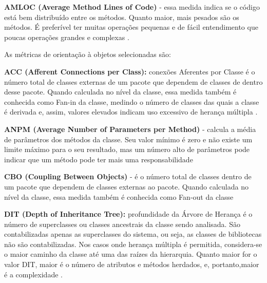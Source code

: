  \vspace{\onelineskip}

\textbf{AMLOC (Average Method Lines of Code)} - essa medida indica se o código está bem distribuído entre os métodos. Quanto maior, mais pesados são os métodos. É preferível ter muitas operações pequenas e de fácil entendimento que poucas operações grandes e complexas \cite{Meirelles2013}.



 \vspace{\onelineskip} 

As métricas de orientação à objetos selecionadas são:

\textbf{ACC (Afferent Connections per Class):} conexões Aferentes por Classe é o número
total de classes externas de um pacote que dependem de classes de dentro desse
pacote. Quando calculada no nível da classe, essa medida também é conhecida como
Fan-in da classe, medindo o número de classes das quais a classe é derivada e, assim,
valores elevados indicam uso excessivo de herança múltipla \cite{McCabe94} \cite{Chidamber94}.

 \vspace{\onelineskip} 

 \textbf{ANPM (Average Number of Parameters per Method)} - calcula a média de parâmetros dos métodos da classe. Seu valor mínimo é zero e não existe um limite máximo para o seu resultado, mas um número alto de parâmetros pode indicar que um método pode ter mais uma responsabilidade \cite{Basili1987}


 \vspace{\onelineskip} 

\textbf{CBO (Coupling Between Objects)} -  é o número total de classes dentro de um pacote que dependem de classes externas ao pacote. Quando calculada no nível da classe, essa medida também é conhecida como Fan-out da classe \cite{Chidamber94}

 \vspace{\onelineskip} 

\textbf{DIT (Depth of Inheritance Tree):} profundidade da Árvore de Herança é o número
de superclasses ou classes ancestrais da classe sendo analisada. São contabilizadas
apenas as superclasses do sistema, ou seja, as classes de bibliotecas não são
contabilizadas. Nos casos onde herança múltipla é permitida, considera-se o maior
caminho da classe até uma das raízes da hierarquia. Quanto maior for o valor DIT,
maior é o número de atributos e métodos herdados, e, portanto,maior é a complexidade
\cite{Shih97}.

